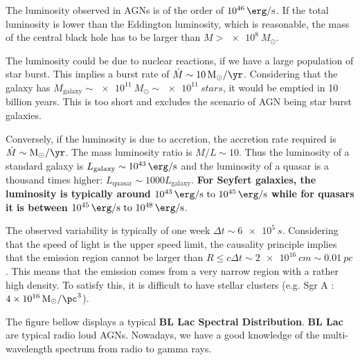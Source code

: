 \documentclass[10pt,a4paper,english]{article}
\begin{document}
The luminosity observed in AGNs is of the order of $\SI{e46}{\erg\per\s}$. If
the total luminosity is lower than the Eddington luminosity, which is
reasonable, the mass of the central black hole has to be larger than $M >
\SI{e8}{M_\odot}$.

The luminosity could be due to nuclear reactions, if we have a large population
of star burst. This implies a burst rate of $\dot{M} \sim
\SI{10}{M_\odot\per\yr}$. Considering that the galaxy has $M_\mathrm{galaxy}
\sim \SI{e11}{M_\odot} \sim \SI{e11}{stars}$, it would be emptied in 10 billion
years. This is too short and excludes the scenario of AGN being star burst
galaxies.

Conversely, if the luminosity is due to accretion, the accretion rate required
is $\dot{M} \sim \si{M_\odot\per\yr}$. The mass luminosity ratio is $M/L \sim
10$. Thus the luminosity of a standard galaxy is $L_\mathrm{galaxy} \sim
\SI{e43}{\erg\per\s}$ and the luminosity of a quasar is a thousand times
higher: $L_\mathrm{quasar}\sim 1000 L_\mathrm{galaxy}$. \textbf{For Seyfert
galaxies, the luminosity is typically around $\SIrange{e43}{e45}{\erg\per\s}$
while for quasars it is between $\SIrange{e45}{e48}{\erg\per\s}$}.

The observed variability is typically of one week $\Delta t \sim \SI{6e5}{s}$.
Considering that the speed of light is the upper speed limit, the causality
principle implies that the emission region cannot be larger than $R \leq
c\Delta t \sim \SI{2e16}{cm} \sim \SI{0.01}{pc}$. This means that the emission
comes from a very narrow region with a rather high density. To satisfy this, it
is difficult to have stellar clusters (e.g. Sgr A :
$\SI{4e16}{M_\odot\per\pc^3}$).

The figure bellow  displays a typical \textbf{BL Lac
Spectral Distribution}. \textbf{BL Lac} are typical radio loud AGNs. Nowadays,
we have a good knowledge of the multi-wavelength spectrum from radio to gamma
rays.
\end{document}
